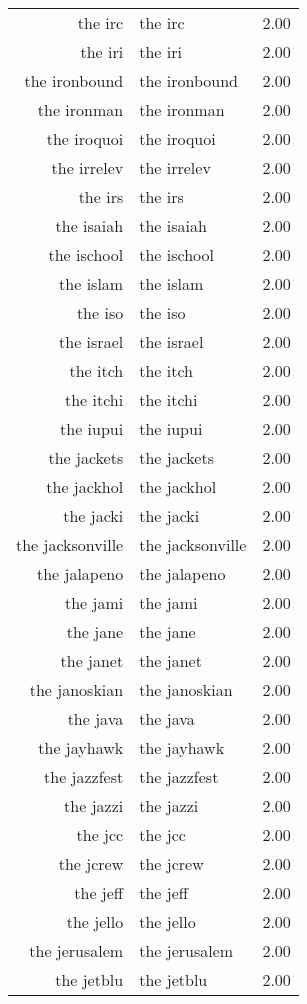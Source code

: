 \begin{table}[ht]
\begin{tabular}{rlr}
  the irc & the irc & 2.00 \\ 
  the iri & the iri & 2.00 \\ 
  the ironbound & the ironbound & 2.00 \\ 
  the ironman & the ironman & 2.00 \\ 
  the iroquoi & the iroquoi & 2.00 \\ 
  the irrelev & the irrelev & 2.00 \\ 
  the irs & the irs & 2.00 \\ 
  the isaiah & the isaiah & 2.00 \\ 
  the ischool & the ischool & 2.00 \\ 
  the islam & the islam & 2.00 \\ 
  the iso & the iso & 2.00 \\ 
  the israel & the israel & 2.00 \\ 
  the itch & the itch & 2.00 \\ 
  the itchi & the itchi & 2.00 \\ 
  the iupui & the iupui & 2.00 \\ 
  the jackets & the jackets & 2.00 \\ 
  the jackhol & the jackhol & 2.00 \\ 
  the jacki & the jacki & 2.00 \\ 
  the jacksonville & the jacksonville & 2.00 \\ 
  the jalapeno & the jalapeno & 2.00 \\ 
  the jami & the jami & 2.00 \\ 
  the jane & the jane & 2.00 \\ 
  the janet & the janet & 2.00 \\ 
  the janoskian & the janoskian & 2.00 \\ 
  the java & the java & 2.00 \\ 
  the jayhawk & the jayhawk & 2.00 \\ 
  the jazzfest & the jazzfest & 2.00 \\ 
  the jazzi & the jazzi & 2.00 \\ 
  the jcc & the jcc & 2.00 \\ 
  the jcrew & the jcrew & 2.00 \\ 
  the jeff & the jeff & 2.00 \\ 
  the jello & the jello & 2.00 \\ 
  the jerusalem & the jerusalem & 2.00 \\ 
  the jetblu & the jetblu & 2.00 \\ 

\end{tabular}
\end{table}

